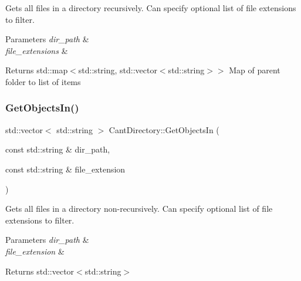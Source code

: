 Gets all files in a directory recursively. Can specify optional list of file extensions to filter. 


\begin{DoxyParams}{Parameters}
{\em dir\+\_\+path} & \\
\hline
{\em file\+\_\+extensions} & \\
\hline
\end{DoxyParams}
\begin{DoxyReturn}{Returns}
std\+::map$<$std\+::string, std\+::vector$<$std\+::string$>$$>$ Map of parent folder to list of items 
\end{DoxyReturn}
\mbox{\label{namespaceCantDirectory_a6b53cda775608f26f9798c40b81f13ef}} 
\subsubsection{\texorpdfstring{Get\+Objects\+In()}{GetObjectsIn()}}
{\footnotesize\ttfamily std\+::vector$<$ std\+::string $>$ Cant\+Directory\+::\+Get\+Objects\+In (\begin{DoxyParamCaption}\item[{const std\+::string \&}]{dir\+\_\+path,  }\item[{const std\+::string \&}]{file\+\_\+extension }\end{DoxyParamCaption})}



Gets all files in a directory non-\/recursively. Can specify optional list of file extensions to filter. 


\begin{DoxyParams}{Parameters}
{\em dir\+\_\+path} & \\
\hline
{\em file\+\_\+extension} & \\
\hline
\end{DoxyParams}
\begin{DoxyReturn}{Returns}
std\+::vector$<$std\+::string$>$ 
\end{DoxyReturn}

